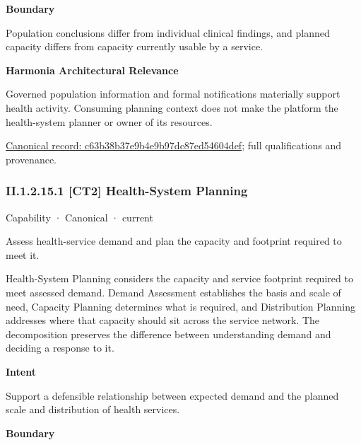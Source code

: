 \textbf{Boundary}



Population conclusions differ from individual clinical findings, and planned capacity differs from capacity currently usable by a service.



\textbf{Harmonia Architectural Relevance}



Governed population information and formal notifications materially support health activity. Consuming planning context does not make the platform the health-system planner or owner of its resources.


{\footnotesize \href{../../../../../../../continuum/strategy/capability/c63b38b37e9b4e9b97dc87ed54604def.md}{Canonical record: c63b38b37e9b4e9b97dc87ed54604def}; full qualifications and provenance.}\par
\subsubsection*{II.1.2.15.1 [CT2] Health-System Planning}
\label{navigation:II.1.2.15.1}

\label{element:9ca4df07eceb4150a0190cc488270ce2}
{\small Capability · Canonical · current}\par

Assess health-service demand and plan the capacity and footprint required to meet it.



Health-System Planning considers the capacity and service footprint required to meet assessed demand. Demand Assessment establishes the basis and scale of need, Capacity Planning determines what is required, and Distribution Planning addresses where that capacity should sit across the service network. The decomposition preserves the difference between understanding demand and deciding a response to it.



\textbf{Intent}



Support a defensible relationship between expected demand and the planned scale and distribution of health services.



\textbf{Boundary}



